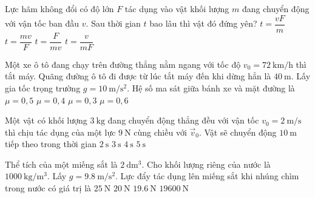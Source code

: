 \begin{ex}
	Lực hãm không đổi có độ lớn $F$ tác dụng vào vật khối lượng $m$ đang chuyển động với vận tốc ban đầu $v$. Sau thời gian $t$ bao lâu thì vật đó đứng yên?
	\choice
	{$t=\dfrac{vF}{m}$}
	{\True $t=\dfrac{mv}{F}$}
	{$t=\dfrac{F}{mv}$}
	{$t=\dfrac{v}{mF}$}
	\loigiai{}
\end{ex}
\begin{ex}
	Một xe ô tô đang chạy trên đường thẳng nằm ngang với tốc độ $v_0=\SI{72}{\kilo\meter/\hour}$ thì tắt máy. Quãng đường ô tô đi được từ lúc tắt máy đến khi dừng hẳn là $\SI{40}{\meter}$. Lấy gia tốc trọng trường $g=\SI{10}{\meter/\second^2}$. Hệ số ma sát giữa bánh xe và mặt đường là
	\choice
	{\True $\mu=0,5$}
	{$\mu=0,4$}
	{$\mu=0,3$}
	{$\mu=0,6$}
	\loigiai{}
\end{ex}
\begin{ex}
Một vật có khối lượng $\SI{3}{\kilogram}$ đang chuyển động thẳng đều với vận tốc $v_0=\SI{2}{\meter/\second}$ thì chịu tác dụng của một lực $\SI{9}{\newton}$ cùng chiều với $\vec{v}_0$. Vật sẽ chuyển động $\SI{10}{\meter}$ tiếp theo trong thời gian	
	\choice
	{\True $\SI{2}{\second}$}
	{$\SI{3}{\second}$}
	{$\SI{4}{\second}$}
	{$\SI{5}{\second}$}
	\loigiai{}
\end{ex}
\begin{ex}
	Thể tích của một miếng sắt là $\SI{2}{\deci\meter^3}$. Cho khối lượng riêng của nước là $\SI{1000}{\kilogram/\meter^3}$. Lấy $g=\SI{9.8}{\meter/\second^2}$. Lực đẩy tác dụng lên miếng sắt khi nhúng chìm trong nước có giá trị là
		\choice
	{$\SI{25}{\newton}$}
	{$\SI{20}{\newton}$}
	{\True $\SI{19.6}{\newton}$}
	{$\SI{19600}{\newton}$}
	\loigiai{}
\end{ex}
